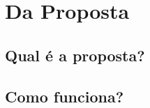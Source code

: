 \chapter{Da Proposta}
\label{cap:propose}

\section{Qual é a proposta?}
\label{sec:what_is}

\section{Como funciona?}
\label{sec:how-it-works}

